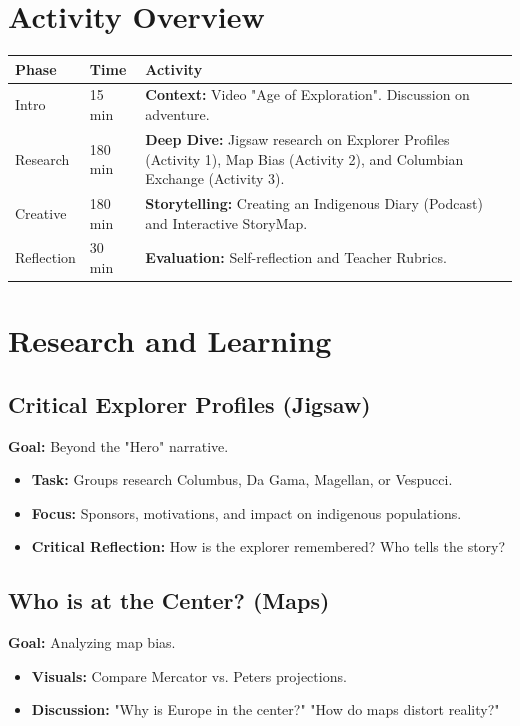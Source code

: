 \documentclass[11pt, a4paper]{article}
\begin{document}
\section*{Activity Overview}
\begingroup
\small
\begin{tabularx}{\textwidth}{|l|l|L|}
    \hline
     \textbf{Phase} & \textbf{Time} & \textbf{Activity} \\ \hline
    Intro & 15 min & \textbf{Context:} Video "Age of Exploration". Discussion on adventure. \\ \hline
    Research & 180 min & \textbf{Deep Dive:} Jigsaw research on Explorer Profiles (Activity 1), Map Bias (Activity 2), and Columbian Exchange (Activity 3). \\ \hline
    Creative & 180 min & \textbf{Storytelling:} Creating an Indigenous Diary (Podcast) and Interactive StoryMap. \\ \hline
    Reflection & 30 min & \textbf{Evaluation:} Self-reflection and Teacher Rubrics. \\ \hline
\end{tabularx}
\endgroup

\section{Research and Learning}
\subsection{Critical Explorer Profiles (Jigsaw)}
\textbf{Goal:} Beyond the "Hero" narrative.
\begin{itemize}
    \item \textbf{Task:} Groups research Columbus, Da Gama, Magellan, or Vespucci.
    \item \textbf{Focus:} Sponsors, motivations, and impact on indigenous populations.
    \item \textbf{Critical Reflection:} How is the explorer remembered? Who tells the story?
\end{itemize}

\subsection{Who is at the Center? (Maps)}
\textbf{Goal:} Analyzing map bias.
\begin{itemize}
    \item \textbf{Visuals:} Compare Mercator vs. Peters projections.
    \item \textbf{Discussion:} "Why is Europe in the center?" "How do maps distort reality?"
\end{itemize}
\end{document}
